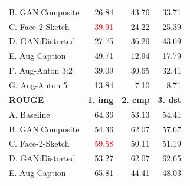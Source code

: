 \documentclass[aspectratio=1610]{beamer} %
\begin{document}
\begin{frame}
\begin{table}[htbp]
{\begin{tabular}{|l|rrr|}
B. GAN:Composite        & 26.84                                                    & 43.76                                               & 33.71                                                      \\
C. Face-2-Sketch       & \textcolor{red}{39.91}                                                 & 24.22                                                     & 25.39                                                      \\
D. GAN:Distorted         & 27.75                                                    & 36.29                                                     & 43.69
\\
\hdashline
E. Aug-Caption             & 49.71                                                  & 12.94                                                     & 17.79                                                      \\
F. Aug-Anton 3:2 & 39.09                                                    & 30.65                                                & 32.41                                                 \\
G. Aug-Anton 5   & 13.84                                                    & 7.10                                                      & 8.71                                                       \\
\hline
\hline
\textbf{ROUGE} & \textbf{1. img} & \textbf{2. cmp} & \textbf{3. dst} \\ 
\hline
A. Baseline          & 64.36                                                  & 53.13                                                     & 54.41                                                      \\
B. GAN:Composite        & 54.36                                                    & 62.07                                                & 57.67                                                      \\
C. Face-2-Sketch       & \textcolor{red}{59.58}                                                & 50.11                                                     & 51.19                                                      \\
D. GAN:Distorted         & 53.27                                                    & 62.07                                                     & 62.65                                                   \\
\hdashline
E. Aug-Caption             & 65.81                                                & 44.41                                                     & 48.03                                                      \\

\end{tabular}}
\end{table}
\end{frame}
\end{document}
